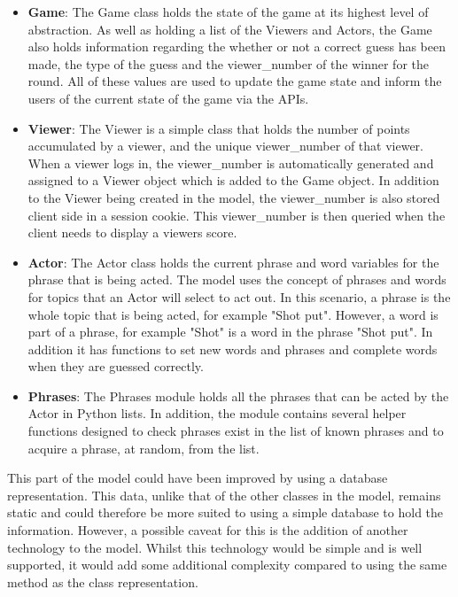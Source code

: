 \begin{itemize}
	\item \textbf{Game}: The Game class holds the state of the game at its highest level of abstraction. As well as holding a list of the Viewers and Actors, the Game also holds information regarding the whether or not a correct guess has been made, the type of the guess and the viewer\_number of the winner for the round. All of these values are used to update the game state and inform the users of the current state of the game via the APIs.
	
	\item \textbf{Viewer}: The Viewer is a simple class that holds the number of points accumulated by a viewer, and the unique viewer\_number of that viewer. When a viewer logs in, the viewer\_number is automatically generated and assigned to a Viewer object which is added to the Game object. In addition to the Viewer being created in the model, the viewer\_number is also stored client side in a session cookie. This viewer\_number is then queried when the client needs to display a viewers score. 
	
	\item \textbf{Actor}: The Actor class holds the current phrase and word variables for the phrase that is being acted. The model uses the concept of phrases and words for topics that an Actor will select to act out. In this scenario, a phrase is the whole topic that is being acted, for example "Shot put". However, a word is part of a phrase, for example "Shot" is a word in the phrase "Shot put". In addition it has functions to set new words and phrases and complete words when they are guessed correctly.
	
	\item \textbf{Phrases}: The Phrases module holds all the phrases that can be acted by the Actor in Python lists. In addition, the module contains several helper functions designed to check phrases exist in the list of known phrases and to acquire a phrase, at random, from the list.
	
\end{itemize}

This part of the model could have been improved by using a database representation. This data, unlike that of the other classes in the model, remains static and could therefore be more suited to using a simple database to hold the information. However, a possible caveat for this is the addition of another technology to the model. Whilst this technology would be simple and is well supported, it would add some additional complexity compared to using the same method as the class representation.


